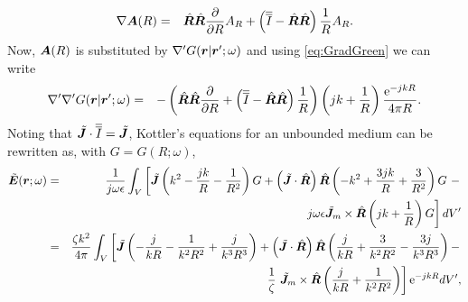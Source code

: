 \begin{eqnarray}
\label{eq:GradVectDyad}
\nabla \mbfit{A}(R) &= & \hat{\mbfit{R}}\hat{\mbfit{R}} \frac{\partial}{\partial R} {A}_R  + \left ( \dyad{I} - \hat{\mbfit{R}}\hat{\mbfit{R}} \right ) \frac{1}{R} {A}_R.
\end{eqnarray} Now, $\mbfit{A}(R)$ is substituted by ${\nabla}' G(\mbfit{r}|\mbfit{r'};\omega)$ and using \eqref{eq:GradGreen} we can write
\begin{eqnarray}
\label{eq:GradGradGreen}
{\nabla}' {\nabla}' G(\mbfit{r}|\mbfit{r'};\omega) &= & - \left (\hat{\mbfit{R}}\hat{\mbfit{R}} \frac{\partial}{\partial R} + \left ( \dyad{I} - \hat{\mbfit{R}}\hat{\mbfit{R}} \right ) \frac{1}{R} \right ) \left ( jk + \frac{1}{R} \right )  \frac{\mrm{e}^{-jkR}}{4\pi R}.
\end{eqnarray}
Noting that $\tilde{\mbfit{J}} \cdot \dyad{I} = \tilde{\mbfit{J}}$, Kottler's equations for an unbounded medium can be rewritten as, with $G = G(R;\omega)$,
\begin{eqnarray}
\label{eq:KottlerEdirect}
\tilde{\mbfit{E}}(\mbfit{r}; \omega) &= & \frac{1}{j \omega \epsilon} \int_V \left [  \tilde{\mbfit{J}} \left ( k^2 - \frac{jk}{R} - \frac{1}{R^2} \right ) G + \left ( \tilde{\mbfit{J}} \cdot \hat{\mbfit{R}} \right ) \hat{\mbfit{R}} \left (- k^2 + \frac{3jk}{R} + \frac{3}{R^2} \right) G \ - \right. \nonumber \\
& & \hspace{.5cm} \left. j \omega \epsilon \tilde{\mbfit{J}}_m  \times \hat{\mbfit{R}} \left ( jk + \frac{1}{R} \right ) G \right ] dV' \nonumber \\
&= & \frac{\zeta k^2}{4 \pi} \int_V \left [  \tilde{\mbfit{J}} \left ( - \frac{j}{kR} - \frac{1}{k^2R^2} + \frac{j}{k^3R^3} \right )  + \left ( \tilde{\mbfit{J}} \cdot \hat{\mbfit{R}} \right ) \hat{\mbfit{R}} \left (\frac{j}{kR} + \frac{3}{k^2R^2} - \frac{3j}{k^3R^3} \right) - \right. \nonumber \\
& & \hspace{.5cm} \left. \frac{1}{\zeta} \ \tilde{\mbfit{J}}_m  \times \hat{\mbfit{R}} \left ( \frac{j}{kR} + \frac{1}{k^2R^2} \right ) \right ] \mrm{e}^{-jkR} dV',
\end{eqnarray}
